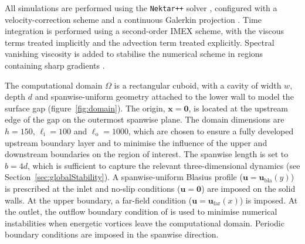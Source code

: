 \documentclass[lineno]{jfm}
\begin{document}
All simulations are performed using the \texttt{Nektar++} solver \citep{nektar}, configured with a velocity-correction scheme and a continuous Galerkin projection \citep{vcs1,vcs2}. Time integration is performed using a second-order IMEX scheme, with the viscous terms treated implicitly and the advection term treated explicitly. Spectral vanishing viscosity is added to stabilise the numerical scheme in regions containing sharp gradients \citep{svv}.

The computational domain $\Omega$ is a rectangular cuboid, with a cavity of width $w$, depth $d$ and spanwise-uniform geometry attached to the lower wall to model the surface gap (figure~\ref{fig:domain}). The origin, $\boldsymbol{x}=\boldsymbol{0}$, is located at the upstream edge of the gap on the outermost spanwise plane. The domain dimensions are $h=150$, $\ell_{\mathrm{i}}=100$ and $\ell_{\mathrm{o}}=1000$, which are chosen to ensure a fully developed upstream boundary layer and to minimise the influence of the upper and downstream boundaries on the region of interest. The spanwise length is set to $b=4d$, which is sufficient to capture the relevant three-dimensional dynamics (see Section~\ref{sec:globalStability}). A spanwise-uniform Blasius profile ($\boldsymbol{u}=\boldsymbol{u}_\mathrm{bla}(y)$) is prescribed at the inlet and no-slip conditions ($\boldsymbol{u}=\boldsymbol{0}$) are imposed on the solid walls. At the upper boundary, a far-field condition ($\boldsymbol{u}=\boldsymbol{u}_\mathrm{far}(x)$) is imposed. At the outlet, the outflow boundary condition of \citet{dong} is used to minimise numerical instabilities when energetic vortices leave the computational domain. Periodic boundary conditions are imposed in the spanwise direction.
\end{document}
